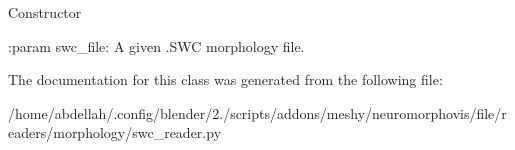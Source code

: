 \begin{DoxyVerb}Constructor

:param swc_file:
    A given .SWC morphology file.
\end{DoxyVerb}
 

The documentation for this class was generated from the following file\+:\begin{DoxyCompactItemize}
\item 
/home/abdellah/.\+config/blender/2./scripts/addons/meshy/neuromorphovis/file/readers/morphology/swc\+\_\+reader.\+py\end{DoxyCompactItemize}
